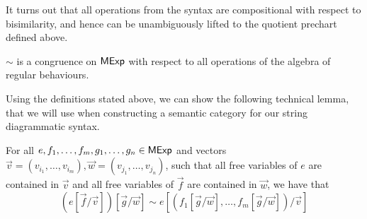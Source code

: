 It turns out that all operations from the syntax are compositional with respect to bisimilarity, and hence can be unambiguously lifted to the quotient prechart defined above.
\begin{lemma}\label{lem:congruence}
	$\sim$ is a congruence on $\mathsf{MExp}$ with respect to all operations of the algebra of regular behaviours.
\end{lemma}
Using the definitions stated above, we can show the following technical lemma, that we will use when constructing a semantic category for our string diagrammatic syntax.
\begin{lemma}\label{lem:subst_lemma}
	For all $e, f_1, \dots, f_m, g_1, \dots, g_n \in \mathsf{MExp}$ and vectors $\vec{v}=(v_{i_1}, \dots, v_{i_m}), \vec{w}=(v_{j_1}, \dots, v_{j_n})$, such that all free variables of $e$ are contained in $\vec{v}$ and all free variables of $\vec{f}$ are contained in $\vec{w}$, we have that 
	$$
	(e[\vec{f}/ \vec{v}])[\vec{g}/\vec{w}] \sim e [(f_1[\vec{g}/\vec{w}], \dots, f_m[\vec{g}/\vec{w}])/\vec{v}] 
	$$
\end{lemma}
